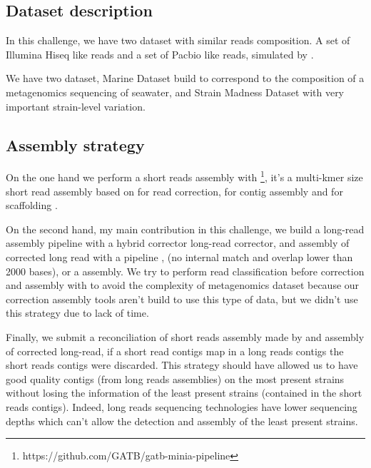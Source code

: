 \documentclass[main.tex]{subfiles}
\begin{document}
\subsection{Dataset description}

In this challenge, we have two dataset with similar reads composition. A set of Illumina Hiseq like reads and a set of Pacbio like reads, simulated by \cite{camisim}.

We have two dataset, Marine Dataset build to correspond to the composition of a metagenomics sequencing of seawater, and Strain Madness Dataset with very important strain-level variation.

\subsection{Assembly strategy}

On the one hand we perform a short reads assembly with  \footnote{https://github.com/GATB/gatb-minia-pipeline}, it's a multi-kmer size short read assembly based on  \cite{bloocoo} for read correction,  \cite{minia, bcalm} for contig assembly and  for scaffolding \cite{besst1, besst2, besst3}.

On the second hand, my main contribution in this challenge, we build a long-read assembly pipeline with  \cite{fmlrc} a hybrid corrector long-read corrector, and assembly of corrected long read with a pipeline \minimap, \fpa (no internal match and overlap lower than 2000 bases), \miniasm or a \wtdbg assembly. We try to perform read classification before correction and assembly with \cite{centrifuge} to avoid the complexity of metagenomics dataset because our correction assembly tools aren't build to use this type of data, but we didn't use this strategy due to lack of time.

Finally, we submit a reconciliation of short reads assembly made by  and \wtdbg assembly of corrected long-read, if a short read contigs map in a long reads contigs the short reads contigs were discarded. This strategy should have allowed us to have good quality contigs (from long reads assemblies) on the most present strains without losing the information of the least present strains (contained in the short reads contigs). Indeed, long reads sequencing technologies have lower sequencing depths which can't allow the detection and assembly of the least present strains.
\end{document}
